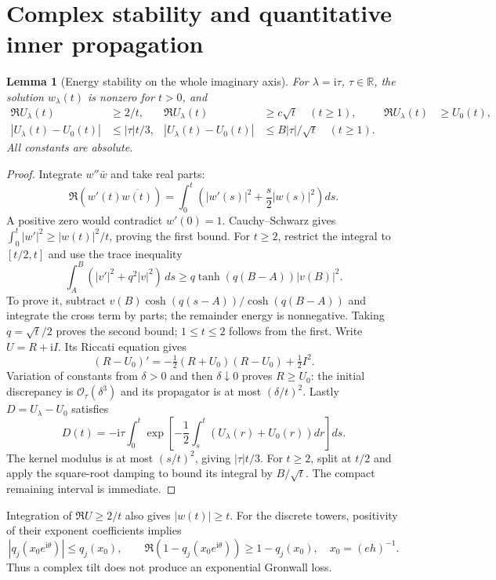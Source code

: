 \documentclass[11pt]{article}
\newtheorem{lemma}[theorem]{Lemma}
\theoremstyle{remark}\newtheorem{remark}[theorem]{Remark}
\newcommand{\OO}{\mathcal O}
\newcommand{\R}{\mathbb R}
\newcommand{\ii}{\mathrm i}
\begin{document}
\section{Complex stability and quantitative inner propagation}\label{xtw:frac:sec:complex}
\begin{lemma}[Energy stability on the whole imaginary axis]\label{xtw:frac:lem:energy}
For $\lambda=\ii\tau$, $\tau\in\R$, the solution $w_\lambda(t)$ is nonzero
for $t>0$, and
\begin{align}
 \Re U_\lambda(t)&\ge2/t,&
 \Re U_\lambda(t)&\ge c\sqrt t\quad(t\ge1),&
 \Re U_\lambda(t)&\ge U_0(t),\label{xtw:frac:eq:energybounds}\\
 |U_\lambda(t)-U_0(t)|&\le|\tau|t/3,&
 |U_\lambda(t)-U_0(t)|&\le B|\tau|/\sqrt t\quad(t\ge1).
                                                        \label{xtw:frac:eq:Udiff}
\end{align}
All constants are absolute.
\end{lemma}
\begin{proof}
Integrate $w''\bar w$ and take real parts:
\begin{equation}\label{xtw:frac:eq:energyidentity}
 \Re(w'(t)\overline{w(t)})=
 \int_0^t\left(|w'(s)|^2+\frac s2|w(s)|^2\right)ds.
\end{equation}
A positive zero would contradict $w'(0)=1$. Cauchy--Schwarz gives
$\int_0^t|w'|^2\ge|w(t)|^2/t$, proving the first bound.
For $t\ge2$, restrict the integral to $[t/2,t]$ and use the trace inequality
\[
 \int_A^B(|v'|^2+q^2|v|^2)\,ds
       \ge q\tanh(q(B-A))|v(B)|^2.
\]
To prove it, subtract
$v(B)\cosh(q(s-A))/\cosh(q(B-A))$ and integrate the cross term by parts;
the remainder energy is nonnegative. Taking $q=\sqrt t/2$ proves the
second bound; $1\le t\le2$ follows from the first.
Write $U=R+\ii I$. Its Riccati equation gives
\[
 (R-U_0)'=-\tfrac12(R+U_0)(R-U_0)+\tfrac12I^2.
\]
Variation of constants from $\delta>0$ and then $\delta\downarrow0$
proves $R\ge U_0$: the initial discrepancy is $\OO_\tau(\delta^3)$
and its propagator is at most $(\delta/t)^2$.
Lastly $D=U_\lambda-U_0$ satisfies
\[
 D(t)=-\ii\tau\int_0^t
 \exp\left[-\frac12\int_s^t(U_\lambda(r)+U_0(r))dr\right]ds.
\]
The kernel modulus is at most $(s/t)^2$, giving $|\tau|t/3$.
For $t\ge2$, split at $t/2$ and apply the square-root damping to bound its
integral by $B/\sqrt t$. The compact remaining interval is immediate.
\end{proof}
Integration of $\Re U\ge2/t$ also gives $|w(t)|\ge t$.
For the discrete towers, positivity of their exponent coefficients implies
\begin{equation}\label{xtw:frac:eq:positivitycomplex}
 |q_j(x_0e^{\ii\theta})|\le q_j(x_0),\qquad
 \Re(1-q_j(x_0e^{\ii\theta}))\ge1-q_j(x_0),
 \quad x_0=(eh)^{-1}.
\end{equation}
Thus a complex tilt does not produce an exponential Gronwall loss.
\end{document}
